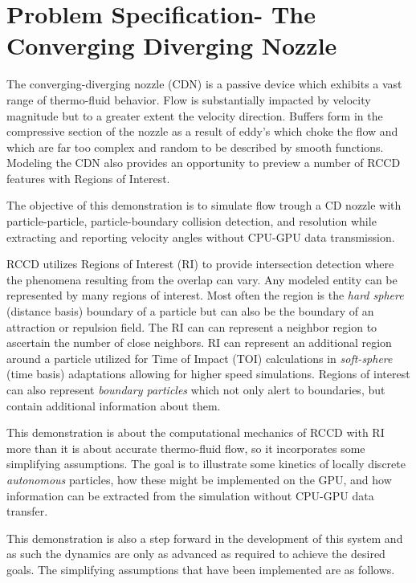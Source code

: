 \onecolumn
\section{Problem Specification- The Converging Diverging Nozzle} \label{cdnoz}

The converging-diverging nozzle (CDN) is a passive device which exhibits a vast range of thermo-fluid behavior. Flow is substantially impacted by velocity magnitude but to a greater extent the velocity direction. Buffers form in the compressive section of the nozzle as a result of eddy's which choke the flow and which are far too complex and random to be described by smooth functions. Modeling the CDN also provides an opportunity to preview a number of RCCD features with Regions of Interest.

The objective of this demonstration is to simulate flow trough a CD nozzle with particle-particle, particle-boundary collision detection, and resolution while extracting and reporting velocity angles without CPU-GPU data transmission.

RCCD utilizes Regions of Interest (RI) to provide intersection detection where the phenomena resulting from the overlap can vary. Any modeled entity can be represented by many regions of interest. Most often the region is the \textit{hard sphere} (distance basis) boundary of a particle but can also be the boundary of an attraction or repulsion field. The RI can can represent a neighbor region to ascertain the number of close neighbors. RI can represent an additional region around a particle utilized for Time of Impact (TOI) calculations in \textit{soft-sphere} (time basis) adaptations allowing for higher speed simulations. Regions of interest can also represent \textit{boundary particles} which not only alert to boundaries, but contain additional information about them.

This demonstration is about the computational mechanics of RCCD with RI more than it is about accurate thermo-fluid flow, so it incorporates some simplifying assumptions. The goal is to illustrate some kinetics of locally discrete \textit{autonomous} particles, how these might be implemented on the GPU, and how information can be extracted from the simulation without CPU-GPU data transfer.

This demonstration is also a step forward in the development of this system and as such the dynamics are only as advanced as required to achieve the desired goals. The simplifying assumptions that have been implemented are as follows.

